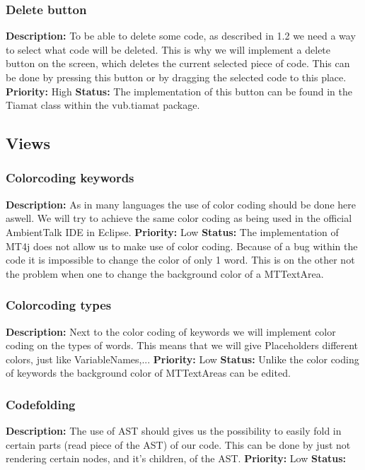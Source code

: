 \documentclass[a4paper,12pt]{report}
\begin{document}
\subsubsection{Delete button}
\textbf{Description: } To be able to delete some code, as described in 1.2 we need a way to select what code will be deleted. This is why we will
implement a delete button on the screen, which deletes the current selected piece of code. This can be done by pressing this button or by dragging the selected code to this place. 
\textbf{Priority:} High \newline
\textbf{Status: } The implementation of this button can be found in the Tiamat class within the vub.tiamat package. \newline
\subsection{Views}
\subsubsection{Colorcoding keywords}
\textbf{Description: }As in many languages the use of color coding should be done here aswell. We  will try to achieve the same color coding as
being used in the official AmbientTalk IDE in Eclipse. \newline
\textbf{Priority:} Low \newline
\textbf{Status: } The implementation of MT4j does not allow us to make use of color coding. Because of a bug within the code it is impossible
to change the color of only 1 word. This is on the other not the problem when one to change the background color of a MTTextArea. \newline
\subsubsection{Colorcoding types}
\textbf{Description: } Next to the color coding of keywords we will implement color coding on the types of words. This means that we will give
Placeholders different colors, just like VariableNames,... \newline
\textbf{Priority:} Low \newline
\textbf{Status: } Unlike the color coding of keywords the background color of MTTextAreas can be edited.\newline
\subsubsection{Codefolding}
\textbf{Description: }The use of AST should gives us the possibility to easily fold in certain parts (read piece of the AST) of our code. This can be done by just not
rendering certain nodes, and it's children, of the AST. \newline
\textbf{Priority:} Low \newline
\textbf{Status: } \newline
\end{document}

